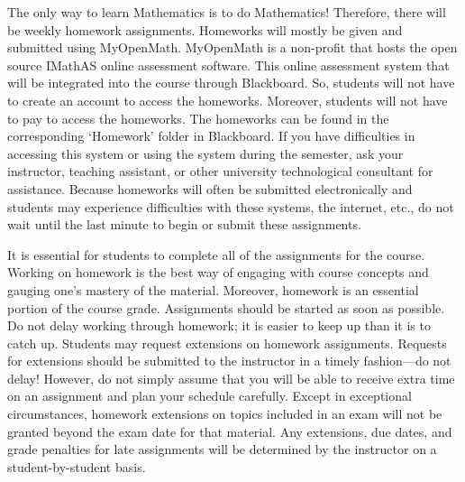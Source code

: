 \documentclass[11pt,letterpaper]{article}
\begin{document}

The only way to learn Mathematics is to do Mathematics! Therefore, there will be weekly homework assignments. Homeworks will mostly be given and submitted using MyOpenMath. MyOpenMath is a non-profit that hosts the open source IMathAS online assessment software. This online assessment system that will be integrated into the course through Blackboard. So, students will not have to create an account to access the homeworks. Moreover, students will not have to pay to access the homeworks. The homeworks can be found in the corresponding `Homework' folder in Blackboard. If you have difficulties in accessing this system or using the system during the semester, ask your instructor, teaching assistant, or other university technological consultant for assistance. Because homeworks will often be submitted electronically and students may experience difficulties with these systems, the internet, etc., do not wait until the last minute to begin or submit these assignments. \par\vspace{0.3cm}

It is essential for students to complete all of the assignments for the course. Working on homework is the best way of engaging with course concepts and gauging one's mastery of the material. Moreover, homework is an essential portion of the course grade. Assignments should be started as soon as possible. Do not delay working through homework; it is easier to keep up than it is to catch up. Students may request extensions on homework assignments. Requests for extensions should be submitted to the instructor in a timely fashion---do not delay! However, do not simply assume that you will be able to receive extra time on an assignment and plan your schedule carefully. Except in exceptional circumstances, homework extensions on topics included in an exam will not be granted beyond the exam date for that material. Any extensions, due dates, and grade penalties for late assignments will be determined by the instructor on a student-by-student basis. \par\vspace{0.3cm}
\end{document}
